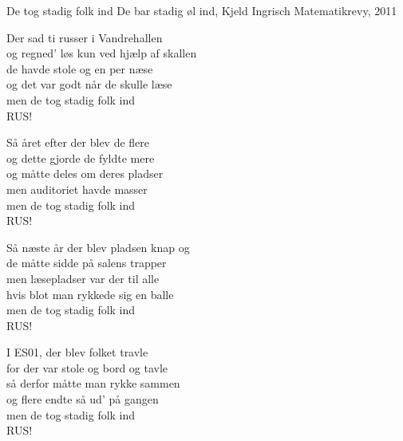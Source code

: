 \begin{song}{De tog stadig folk ind}
  {} %
  {De bar stadig øl ind, Kjeld Ingrisch} %
  {} %
  {Matematikrevy, 2011} %
  {\NotCCLIed} %

  \begin{SBVerse}
    Der sad ti russer i Vandrehallen\\
    og regned' løs kun ved hjælp af skallen\\
    de havde stole og en per næse\\
    og det var godt når de skulle læse\\
    men de tog stadig folk ind\\
    RUS!
  \end{SBVerse}

  \begin{SBVerse}
    Så året efter der blev de flere\\
    og dette gjorde de fyldte mere\\
    og måtte deles om deres pladser\\
    men auditoriet havde masser\\
    men de tog stadig folk ind\\
    RUS!
  \end{SBVerse}

  \begin{SBVerse}
    Så næste år der blev pladsen knap og\\
    de måtte sidde på salens trapper\\
    men læsepladser var der til alle\\
    hvis blot man rykkede sig en balle\\
    men de tog stadig folk ind\\
    RUS!
  \end{SBVerse}

  \begin{SBVerse}
    I ES01, der blev folket travle\\
    for der var stole og bord og tavle\\
    så derfor måtte man rykke sammen\\
    og flere endte så ud' på gangen\\
    men de tog stadig folk ind\\
    RUS!
  \end{SBVerse}


\end{song}
